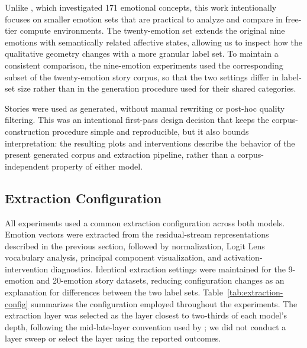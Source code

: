 Unlike \cite{sofroniew_emotion_2026}, which investigated 171 emotional concepts, this work intentionally focuses on smaller
emotion sets that are practical to analyze and compare in free-tier compute environments. The twenty-emotion set extends
the original nine emotions with semantically related affective states,
allowing us to inspect how the qualitative geometry changes with a more granular label set. To maintain a consistent 
comparison, the nine-emotion experiments used the corresponding subset of the twenty-emotion story corpus,
so that the two settings differ in label-set size rather than in the generation procedure used for their shared categories.

Stories were used as generated, without manual rewriting or post-hoc quality filtering. This was an intentional first-pass 
design decision that keeps the corpus-construction procedure simple and reproducible, but it also bounds interpretation: 
the resulting plots and interventions describe the behavior of the present generated corpus and extraction pipeline, rather 
than a corpus-independent property of either model.

\subsection{Extraction Configuration}

All experiments used a common extraction configuration across both models. Emotion vectors
were extracted from the residual-stream representations described in the previous section, followed by normalization, Logit Lens vocabulary
analysis, principal component visualization, and activation-intervention diagnostics. Identical extraction settings were maintained for the 
9-emotion and 20-emotion story datasets, reducing configuration changes as an explanation for differences between the two label sets. 
Table~\ref{tab:extraction-config} summarizes the configuration employed throughout the experiments. The extraction layer was selected 
as the layer closest to two-thirds of each model's depth, following the mid-late-layer convention used by \cite{sofroniew_emotion_2026}; 
we did not conduct a layer sweep or select the layer using the reported outcomes.

